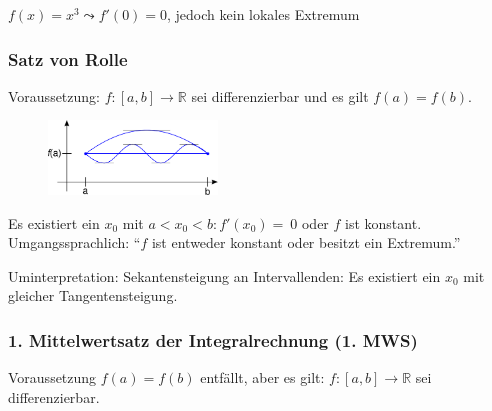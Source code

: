 \begin{note}
	$f(x) = x^3 \leadsto f'(0) = 0$, jedoch kein lokales Extremum
\end{note}

\subsubsection*{Satz von Rolle}
Voraussetzung: $f:[a, b] \rightarrow \mathbb{R}$ sei differenzierbar und es gilt $f(a) = f(b)$.
\begin{figure}
 	\centering
	\includegraphics[width=0.4\textwidth]{include/20091201-2.pdf}
\end{figure}

\begin{theorem}
Es existiert ein $x_0$ mit $a < x_0 < b : f'(x_0) =~0$ oder $f$ ist konstant. Umgangssprachlich: "`$f$ ist entweder konstant oder besitzt ein Extremum."'
\end{theorem}

\noindent Uminterpretation: Sekantensteigung an Intervallenden: Es existiert ein $x_0$ mit gleicher Tangentensteigung.

\subsubsection*{1. Mittelwertsatz der Integralrechnung (1. MWS)}
Voraussetzung $f(a) = f(b)$ entfällt, aber es gilt: $f:[a,b] \rightarrow \mathbb{R}$ sei differenzierbar.

